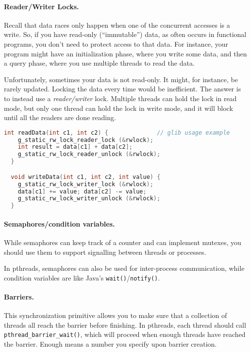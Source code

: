 \paragraph{Reader/Writer Locks.} Recall that data races only happen when
one of the concurrent accesses is a write. So, if you have read-only
(``immutable'') data, as often occurs in functional programs, you don't need
to protect access to that data. For instance, your program might
have an initialization phase, where you write some data, and then a 
query phase, where you use multiple threads to read the data.

Unfortunately, sometimes your data is not read-only. It might, for instance,
be rarely updated. Locking the data every time would be inefficient.
The answer is to instead use a \emph{reader/writer} lock. Multiple
threads can hold the lock in read mode, but only one thread can hold the
lock in write mode, and it will block until all the readers are done 
reading.

\begin{lstlisting}[language=C]
  int readData(int c1, int c2) {              // glib usage example
    g_static_rw_lock_reader_lock (&rwlock);
    int result = data[c1] + data[c2];
    g_static_rw_lock_reader_unlock (&rwlock);
  }

  void writeData(int c1, int c2, int value) {
    g_static_rw_lock_writer_lock (&rwlock);
    data[c1] += value; data[c2] -= value;
    g_static_rw_lock_writer_unlock (&rwlock);
  }
\end{lstlisting}

\paragraph{Semaphores/condition variables.} 
While semaphores can keep track of a counter and can implement
mutexes, you should use them to support signalling between threads or
processes.

In pthreads, semaphores can also be used for inter-process communication,
while condition variables are like Java's {\tt wait()}/{\tt notify()}.

\paragraph{Barriers.} This synchronization primitive allows you 
to make sure that a collection of threads all reach the
barrier before finishing. In pthreads, each thread should call
\verb+pthread_barrier_wait()+, which will proceed when enough threads
have reached the barrier. Enough means a number you specify upon
barrier creation.

